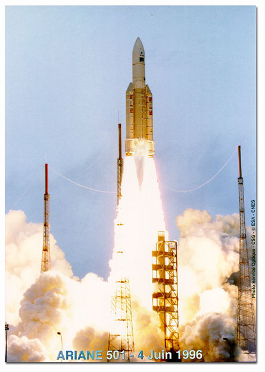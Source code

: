 \documentclass[12pt]{article}
\begin{document}
	\begin{minipage}{0.24\textwidth}
		\centering
		\includegraphics[width=0.9\linewidth]{009_ArianeDecollage.jpg} %
	\end{minipage}\hfill
\end{document}
